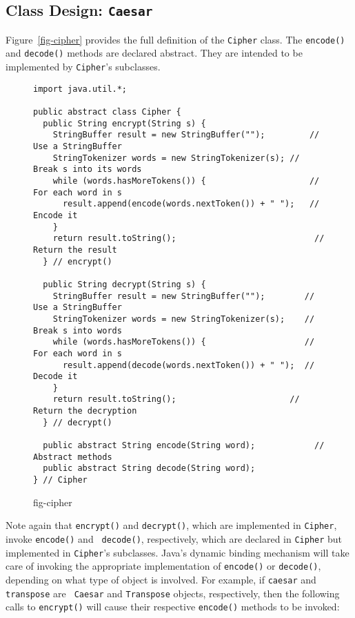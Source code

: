 \subsection{Class Design: {\tt Caesar} }
\noindent Figure~\ref{fig-cipher} provides the full definition of the
{\tt Cipher} class.  The \mbox{\tt encode()} and {\tt decode()} methods are
declared abstract.  They are intended to be implemented by
{\tt Cipher}'s subclasses.

\begin{figure}[h!]
\jjjprogstart
\begin{jjjlisting}[35pc]
\begin{lstlisting}
import java.util.*;

public abstract class Cipher {
  public String encrypt(String s) {
    StringBuffer result = new StringBuffer("");         // Use a StringBuffer
    StringTokenizer words = new StringTokenizer(s); // Break s into its words
    while (words.hasMoreTokens()) {                     // For each word in s
      result.append(encode(words.nextToken()) + " ");   //  Encode it
    }
    return result.toString();                            // Return the result
  } // encrypt()

  public String decrypt(String s) {
    StringBuffer result = new StringBuffer("");        // Use a StringBuffer
    StringTokenizer words = new StringTokenizer(s);    // Break s into words
    while (words.hasMoreTokens()) {                    // For each word in s
      result.append(decode(words.nextToken()) + " ");  //  Decode it
    }
    return result.toString();                       // Return the decryption
  } // decrypt()

  public abstract String encode(String word);            // Abstract methods
  public abstract String decode(String word);
} // Cipher
\end{lstlisting}
\end{jjjlisting}
{fig-cipher}
\end{figure}


Note again that {\tt encrypt()} and {\tt decrypt()}, which are
implemented in \mbox{\tt Cipher}, invoke {\tt encode()} and {\tt
decode()},  respectively, which are declared in {\tt Cipher} but
implemented in {\tt Cipher}'s subclasses.  Java's dynamic binding
mechanism will take care of invoking the appropriate implementation of
{\tt encode()} or {\tt decode()}, depending on what type of object is
involved.  For example, if {\tt caesar} and {\tt transpose} are {\tt
Caesar} and {\tt Transpose} objects, respectively, then the following
calls to {\tt encrypt()} will cause their respective {\tt encode()}
methods to be invoked:

